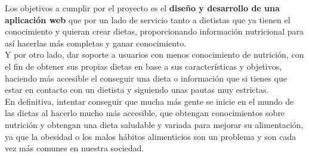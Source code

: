 Los objetivos a cumplir por el proyecto es el \textbf{diseño y desarrollo de una aplicación web} que por un lado de servicio tanto a dietistas
que ya tienen el conocimiento y quieran crear dietas, proporcionando información nutricional para así hacerlas más completas y ganar 
conocimiento.\\

Y por otro lado, dar soporte a usuarios con menos conocimiento de nutrición, con el fin de obtener sus propias dietas en base a sus características y objetivos,
haciendo más accesible el conseguir una dieta o información que si tienes que estar en contacto con un dietista y siguiendo unas pautas muy estrictas.\\

En definitiva, intentar conseguir que mucha más gente se inicie en el mundo de las dietas al hacerlo mucho 
más accesible, que obtengan conocimientos sobre nutrición y obtengan una dieta saludable y variada para mejorar su alimentación,
ya que la obesidad o los malos hábitos alimenticios son un problema y son cada vez más comunes en nuestra sociedad.
